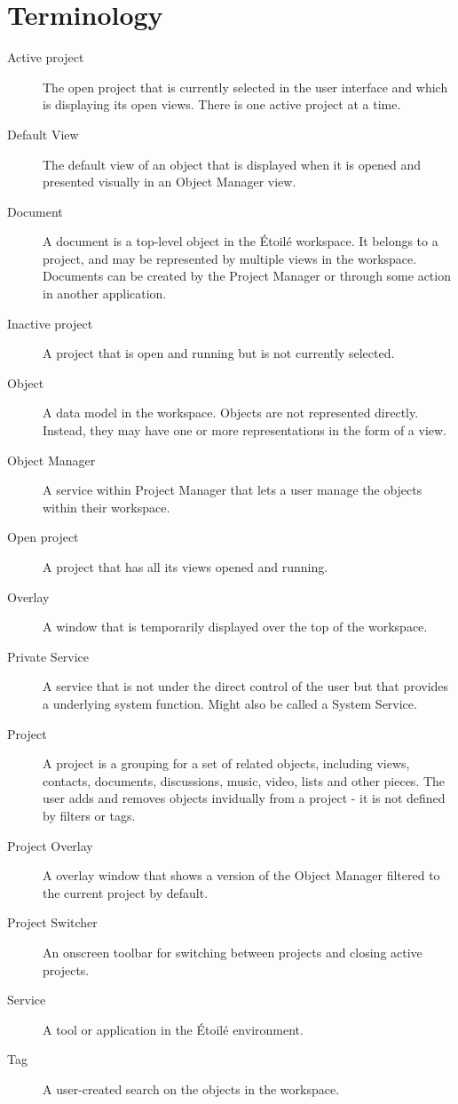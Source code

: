 \documentclass[11pt]{report}
\newcommand{\etoile}{\'Etoil\'e\xspace}
\newcommand{\proman}{Project Manager\xspace}
\begin{document}
\section{Terminology}
\begin{description}
\item[Active project] The open project that is currently selected in the user interface and which is displaying its open views. There is one active project at a time.
\item[Default View] The default view of an object that is displayed when it is opened and presented visually in an Object Manager view.
\item[Document] A document is a top-level object in the \etoile workspace. It belongs to a project, and may be represented by multiple views in the workspace. Documents can be created by the \proman or through some action in another application.
\item[Inactive project] A project that is open and running but is not currently selected. 
\item[Object] A data model in the workspace. Objects are not represented directly. Instead, they may have one or more representations in the form of a view.
\item[Object Manager] A service within \proman that lets a user manage the objects within their workspace.
\item[Open project] A project that has all its views opened and running.
\item[Overlay] A window that is temporarily displayed over the top of the workspace.
\item[Private Service] A service that is not under the direct control of the user but that provides a underlying system function. Might also be called a System Service.
\item[Project]  A project is a grouping for a set of related objects, including views, contacts, documents, discussions, music, video, lists and other pieces. The user adds and removes objects invidually from a project - it is not defined by filters or tags.
\item[Project Overlay] A overlay window that shows a version of the Object Manager filtered to the current project by default.
\item[Project Switcher] An onscreen toolbar for switching between projects and closing active projects.
\item[Service] A tool or application in the \etoile environment.
\item[Tag] A user-created search on the objects in the workspace.

\end{description}
\end{document}
